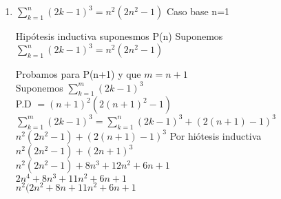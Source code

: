 \documentclass[a4paper,10pt]{article}
\begin{document}
\begin{enumerate}
\begin{enumerate}
\begin{itemize}
      \end{itemize}
				\item $\sum\limits_{k=1}^n (2k - 1)^3 = n^2(2n^2 - 1)$	
          Caso base n=1

          Hipótesis inductiva suponesmos P(n)
          Suponemos $\sum\limits_{k=1}^n (2k-1)^3 = n^2 (2n^2 -1)$
          
          Probamos para P(n+1) y que $m = n +1$\\
          Suponemos $\sum\limits_{k=1}^m (2k-1)^3$\\
          P.D $ = (n+1)^2 (2(n+1)^2 -1)$\\
          $\sum\limits_{k=1}^m (2k-1)^3 = \sum\limits_{k=1}^n (2k-1)^3 + (2(n+1)-1)^3$\\
          $n^2 (2n^2 -1) + (2(n+1)-1)^3$ \hfill Por hi\'otesis inductiva\\
          $n^2 (2n^2 -1) + (2n+1)^3$\\
          $n^2 (2n^2 -1) + 8n^3 + 12n^2 + 6n + 1$\\
          $2n^4 + 8n^3 + 11n^2 + 6n + 1$\\
          $n^2 (2n^2 + 8n + 11n^2 + 6n + 1$\\



			\end{enumerate}	

	\end{enumerate}	
\end{document}
